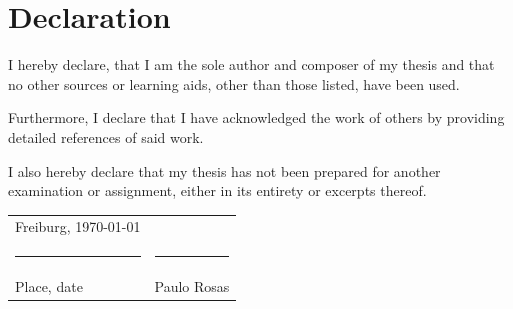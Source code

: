 \begingroup
\setlength{\parindent}{0pt}

\section*{Declaration}

\bigskip
\bigskip
\bigskip

I hereby declare, that I am the sole author and composer of my thesis and
that no other sources or learning aids, other than those listed, have been used.

Furthermore, I declare that I have acknowledged the work of others
by providing detailed references of said work.

I also hereby declare that my thesis has not been prepared
for another examination or assignment, either in its entirety or excerpts thereof.

\bigskip
\bigskip
\bigskip
\bigskip
\bigskip
\bigskip

\begin{tabular}{p{} l}
    Freiburg, \today             &                              \\
    \rule{\textwidth*2/5}{0.4pt} & \rule{\textwidth*2/5}{0.4pt} \\
    Place, date                  & Paulo Rosas
\end{tabular}

\endgroup
